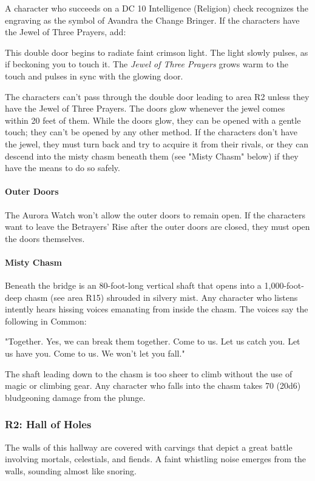 \documentclass[10pt,a4,twoside,twocolumn,openany,nodeprecatedcode]{dndbook}
\begin{document}
A character who succeeds on a DC 10 Intelligence (Religion) check recognizes the engraving as the symbol of Avandra the Change Bringer. If the characters have the Jewel of Three Prayers, add:
\begin{DndReadAloud}{}
This double door begins to radiate faint crimson light. The light slowly pulses, as if beckoning you to touch it. The \textit{Jewel of Three Prayers} grows warm to the touch and pulses in sync with the glowing door.
\end{DndReadAloud}

The characters can't pass through the double door leading to area R2 unless they have the Jewel of Three Prayers. The doors glow whenever the jewel comes within 20 feet of them. While the doors glow, they can be opened with a gentle touch; they can't be opened by any other method. If the characters don't have the jewel, they must turn back and try to acquire it from their rivals, or they can descend into the misty chasm beneath them (see "Misty Chasm" below) if they have the means to do so safely.
\paragraph{Outer Doors}
The Aurora Watch won't allow the outer doors to remain open. If the characters want to leave the Betrayers' Rise after the outer doors are closed, they must open the doors themselves.
\paragraph{Misty Chasm}
Beneath the bridge is an 80-foot-long vertical shaft that opens into a 1,000-foot-deep chasm (see area R15) shrouded in silvery mist. Any character who listens intently hears hissing voices emanating from inside the chasm. The voices say the following in Common:
\begin{DndReadAloud}{}
"Together. Yes, we can break them together. Come to us. Let us catch you. Let us have you. Come to us. We won't let you fall."
\end{DndReadAloud}

The shaft leading down to the chasm is too sheer to climb without the use of magic or climbing gear. Any character who falls into the chasm takes 70 (20d6) bludgeoning damage from the plunge.
\subsubsection{R2: Hall of Holes}
\begin{DndReadAloud}{}
The walls of this hallway are covered with carvings that depict a great battle involving mortals, celestials, and fiends. A faint whistling noise emerges from the walls, sounding almost like snoring.
\end{DndReadAloud}
\end{document}
